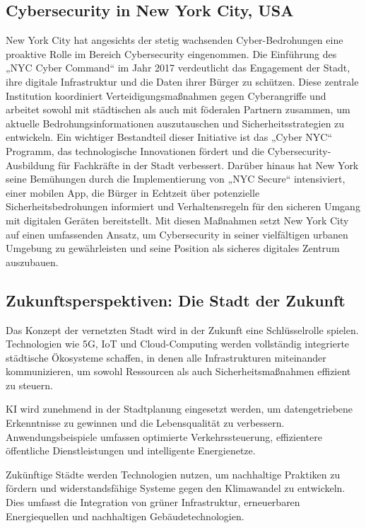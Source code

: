 \documentclass[conference,compsoc,final,a4paper, onecolumn, 11pt]{IEEEtran}
\begin{document}
\subsection{Cybersecurity in New York City, USA}
New York City hat angesichts der stetig wachsenden Cyber-Bedrohungen eine proaktive Rolle im Bereich Cybersecurity eingenommen. 
Die Einführung des „NYC Cyber Command“ im Jahr 2017 verdeutlicht das Engagement der Stadt, ihre digitale Infrastruktur und die Daten ihrer Bürger zu schützen. 
Diese zentrale Institution koordiniert Verteidigungsmaßnahmen gegen Cyberangriffe und arbeitet sowohl mit städtischen als auch mit föderalen Partnern zusammen, um aktuelle Bedrohungsinformationen auszutauschen und Sicherheitsstrategien zu entwickeln. \autocite{noauthor_cybersecurity_nodate} 
Ein wichtiger Bestandteil dieser Initiative ist das „Cyber NYC“ Programm, das technologische Innovationen fördert und die Cybersecurity-Ausbildung für Fachkräfte in der Stadt verbessert. \autocite{noauthor_cybersecurity_nodate} 
Darüber hinaus hat New York seine Bemühungen durch die Implementierung von „NYC Secure“ intensiviert, einer mobilen App, die Bürger in Echtzeit über potenzielle Sicherheitsbedrohungen informiert und Verhaltensregeln für den sicheren Umgang mit digitalen Geräten bereitstellt. \autocite{noauthor_nyc_nodate} 
Mit diesen Maßnahmen setzt New York City auf einen umfassenden Ansatz, um Cybersecurity in seiner vielfältigen urbanen Umgebung zu gewährleisten und seine Position als sicheres digitales Zentrum auszubauen.


\subsection{Zukunftsperspektiven: Die Stadt der Zukunft}
Das Konzept der vernetzten Stadt wird in der Zukunft eine Schlüsselrolle spielen. 
Technologien wie 5G, \ac{IoT} und Cloud-Computing werden vollständig integrierte städtische Ökosysteme schaffen, in denen alle Infrastrukturen miteinander kommunizieren, um sowohl Ressourcen als auch Sicherheitsmaßnahmen effizient zu steuern.

\ac{KI} wird zunehmend in der Stadtplanung eingesetzt werden, um datengetriebene Erkenntnisse zu gewinnen und die Lebensqualität zu verbessern. 
Anwendungsbeispiele umfassen optimierte Verkehrssteuerung, effizientere öffentliche Dienstleistungen und intelligente Energienetze.

Zukünftige Städte werden Technologien nutzen, um nachhaltige Praktiken zu fördern und widerstandsfähige Systeme gegen den Klimawandel zu entwickeln. 
Dies umfasst die Integration von grüner Infrastruktur, erneuerbaren Energiequellen und nachhaltigen Gebäudetechnologien.
\end{document}
